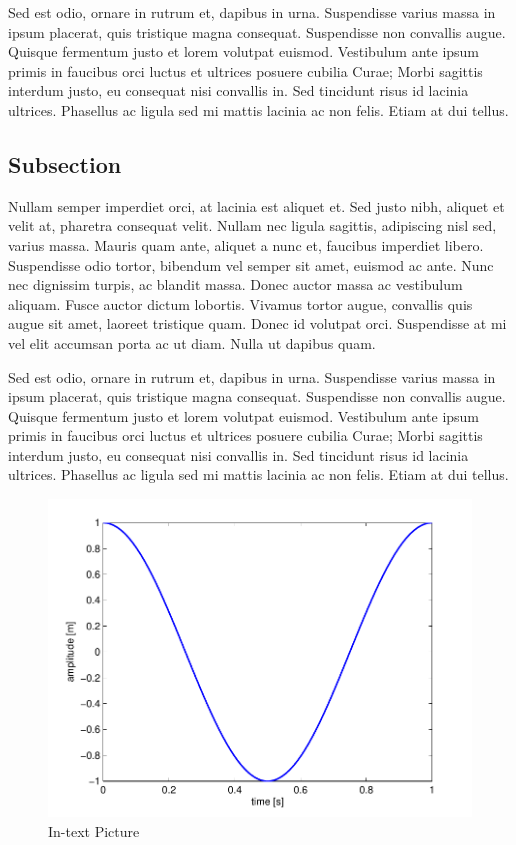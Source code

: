 \documentclass[fleqn,10pt]{JLA_article} %
\begin{document}
Sed est odio, ornare in rutrum et, dapibus in urna. Suspendisse varius massa in ipsum placerat, quis tristique magna consequat. Suspendisse non convallis augue. Quisque fermentum justo et lorem volutpat euismod. Vestibulum ante ipsum primis in faucibus orci luctus et ultrices posuere cubilia Curae; Morbi sagittis interdum justo, eu consequat nisi convallis in. Sed tincidunt risus id lacinia ultrices. Phasellus ac ligula sed mi mattis lacinia ac non felis. Etiam at dui tellus.

\hypertarget{subsection-1}{%
\subsection{Subsection}\label{subsection-1}}

Nullam semper imperdiet orci, at lacinia est aliquet et. Sed justo nibh, aliquet et velit at, pharetra consequat velit. Nullam nec ligula sagittis, adipiscing nisl sed, varius massa. Mauris quam ante, aliquet a nunc et, faucibus imperdiet libero. Suspendisse odio tortor, bibendum vel semper sit amet, euismod ac ante. Nunc nec dignissim turpis, ac blandit massa. Donec auctor massa ac vestibulum aliquam. Fusce auctor dictum lobortis. Vivamus tortor augue, convallis quis augue sit amet, laoreet tristique quam. Donec id volutpat orci. Suspendisse at mi vel elit accumsan porta ac ut diam. Nulla ut dapibus quam.

Sed est odio, ornare in rutrum et, dapibus in urna. Suspendisse varius massa in ipsum placerat, quis tristique magna consequat. Suspendisse non convallis augue. Quisque fermentum justo et lorem volutpat euismod. Vestibulum ante ipsum primis in faucibus orci luctus et ultrices posuere cubilia Curae; Morbi sagittis interdum justo, eu consequat nisi convallis in. Sed tincidunt risus id lacinia ultrices. Phasellus ac ligula sed mi mattis lacinia ac non felis. Etiam at dui tellus.

\begin{figure}[ht]\centering
\includegraphics[width=\linewidth/2]{fig/results}
\caption{In-text Picture}
\label{fig:results}
\end{figure}
\end{document}
